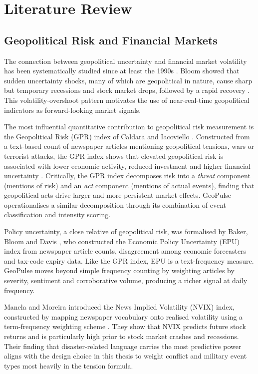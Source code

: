 \documentclass[12pt,a4paper]{report}
\begin{document}
\chapter{Literature Review}
\label{ch:litreview}

\section{Geopolitical Risk and Financial Markets}

The connection between geopolitical uncertainty and financial market volatility
has been systematically studied since at least the 1990s \cite{bloom2009}.
Bloom showed that sudden uncertainty shocks, many of which are geopolitical in
nature, cause sharp but temporary recessions and stock market drops, followed by
a rapid recovery \cite{bloom2009}. This volatility-overshoot pattern motivates
the use of near-real-time geopolitical indicators as forward-looking market
signals.

The most influential quantitative contribution to geopolitical risk measurement
is the Geopolitical Risk (GPR) index of Caldara and Iacoviello \cite{caldara2022}.
Constructed from a text-based count of newspaper articles mentioning geopolitical
tensions, wars or terrorist attacks, the GPR index shows that elevated
geopolitical risk is associated with lower economic activity, reduced investment
and higher financial uncertainty \cite{caldara2022}. Critically, the GPR index
decomposes risk into a \emph{threat} component (mentions of risk) and an
\emph{act} component (mentions of actual events), finding that geopolitical
acts drive larger and more persistent market effects. GeoPulse operationalises
a similar decomposition through its combination of event classification and
intensity scoring.

Policy uncertainty, a close relative of geopolitical risk, was formalised by
Baker, Bloom and Davis \cite{baker2016}, who constructed the Economic Policy
Uncertainty (EPU) index from newspaper article counts, disagreement among
economic forecasters and tax-code expiry data. Like the GPR index, EPU is a
text-frequency measure. GeoPulse moves beyond simple frequency counting by
weighting articles by severity, sentiment and corroborative volume, producing
a richer signal at daily frequency.

Manela and Moreira introduced the News Implied Volatility (NVIX) index,
constructed by mapping newspaper vocabulary onto realised volatility using a
term-frequency weighting scheme \cite{manela2017}. They show that NVIX predicts
future stock returns and is particularly high prior to stock market crashes and
recessions. Their finding that disaster-related language carries the most
predictive power aligns with the design choice in this thesis to weight conflict
and military event types most heavily in the tension formula.
\end{document}
